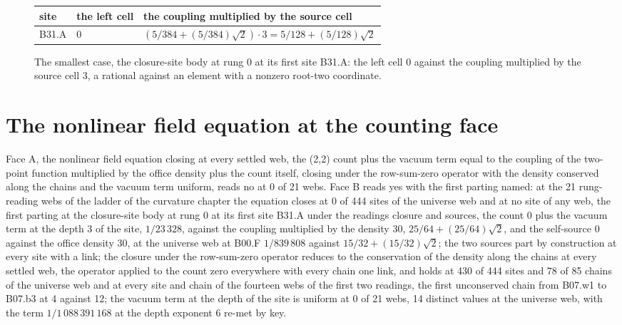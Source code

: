 \begin{figure}[h]
\centering
\begin{adjustbox}{max width=\linewidth}\begin{tabular}{lll}
\hline
site & the left cell & the coupling multiplied by the source cell \\
\hline
B31.A & 0 & $(5/384 + (5/384)\sqrt{2})\cdot 3 = 5/128 + (5/128)\sqrt{2}$ \\
\hline
\end{tabular}\end{adjustbox}
\caption{The smallest case, the closure-site body at rung 0 at its first site B31.A: the left cell 0 against the coupling multiplied by the source cell 3, a rational against an element with a nonzero root-two coordinate.}
\end{figure}
\section{The nonlinear field equation at the counting face}\label{mod:X-2-D543652-w-nlfe}
\begin{chwall}\label{box:X-2-D543652-w-nlfe:1}
Face A, the nonlinear field equation closing at every settled web, the (2,2) count plus the vacuum term equal to the coupling of the two-point function multiplied by the office density plus the count itself, closing under the row-sum-zero operator with the density conserved along the chains and the vacuum term uniform, reads no at 0 of 21 webs. Face B reads yes with the first parting named: at the 21 rung-reading webs of the ladder of the curvature chapter the equation closes at 0 of 444 sites of the universe web and at no site of any web, the first parting at the closure-site body at rung 0 at its first site B31.A under the readings closure and sources, the count 0 plus the vacuum term at the depth 3 of the site, $1/23\,328$, against the coupling multiplied by the density 30, $25/64 + (25/64)\sqrt{2}$, and the self-source 0 against the office density 30, at the universe web at B00.F $1/839\,808$ against $15/32 + (15/32)\sqrt{2}$; the two sources part by construction at every site with a link; the closure under the row-sum-zero operator reduces to the conservation of the density along the chains at every settled web, the operator applied to the count zero everywhere with every chain one link, and holds at 430 of 444 sites and 78 of 85 chains of the universe web and at every site and chain of the fourteen webs of the first two readings, the first unconserved chain from B07.w1 to B07.b3 at 4 against 12; the vacuum term at the depth of the site is uniform at 0 of 21 webs, 14 distinct values at the universe web, with the term $1/1\,088\,391\,168$ at the depth exponent 6 re-met by key.
\end{chwall}
